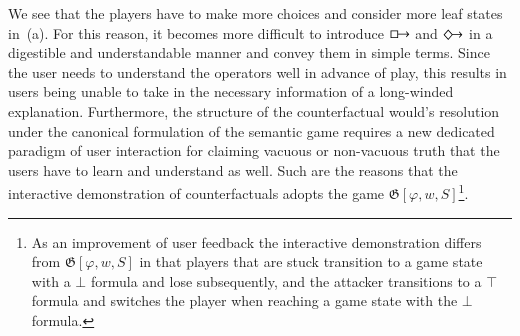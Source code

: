 \documentclass[a4paper,american,10pt]{paper}
\theoremstyle{definition}\newtheorem{definition}{Definition}
\begin{document}
We see that the players have to make more choices and consider more leaf states in~(a). For this reason, it becomes more difficult to introduce $\boxright$ and $\Diamondright$ in a digestible and understandable manner and convey them in simple terms. Since the user needs to understand the operators well in advance of play, this results in users being unable to take in the necessary information of a long-winded explanation. Furthermore, the structure of the counterfactual would's resolution under the canonical formulation of the semantic game requires a new dedicated paradigm of user interaction for claiming vacuous or non-vacuous truth that the users have to learn and understand as well. Such are the reasons that the interactive demonstration of counterfactuals adopts the game $\mathfrak{G}[\varphi ,w,S]$\footnote{As an improvement of user feedback the interactive demonstration differs from $\mathfrak{G}[\varphi ,w,S]$ in that players that are stuck transition to a game state with a $\bot$ formula and lose subsequently, and the attacker transitions to a $\top$ formula and switches the player when reaching a game state with the $\bot$ formula.}.
\end{document}
